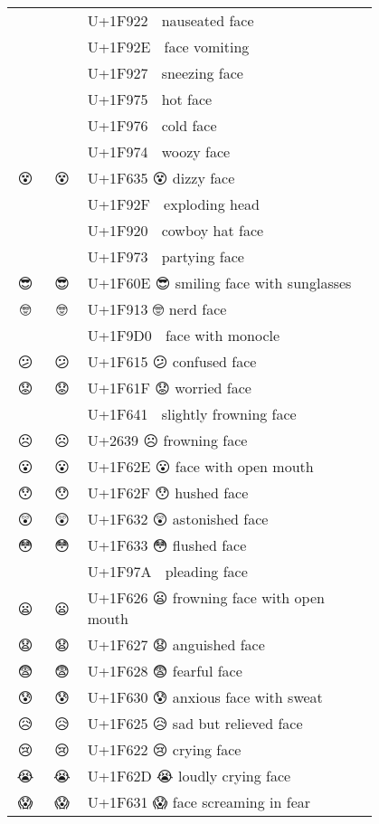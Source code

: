 \documentclass[a4paper,12pt]{ltjarticle}
\newcommand{\fontA}[1]{{\fontspec[RawFeature={mode=harf,+dist,+ccmp}]{Segoe UI Emoji} #1}}
\newcommand{\fontB}[1]{{\fontspec[RawFeature={mode=harf,+dist,+ccmp}]{Noto Color Emoji} #1}}
\begin{document}
\begin{longtable}[c]{ccp{0.8\linewidth}}
\fontA{🤢}&\fontB{🤢}&U+1F922 🤢 nauseated face\\
\fontA{🤮}&\fontB{🤮}&U+1F92E 🤮 face vomiting\\
\fontA{🤧}&\fontB{🤧}&U+1F927 🤧 sneezing face\\
\fontA{🥵}&\fontB{🥵}&U+1F975 🥵 hot face\\
\fontA{🥶}&\fontB{🥶}&U+1F976 🥶 cold face\\
\fontA{🥴}&\fontB{🥴}&U+1F974 🥴 woozy face\\
\fontA{😵}&\fontB{😵}&U+1F635 😵 dizzy face\\
\fontA{🤯}&\fontB{🤯}&U+1F92F 🤯 exploding head\\
\fontA{🤠}&\fontB{🤠}&U+1F920 🤠 cowboy hat face\\
\fontA{🥳}&\fontB{🥳}&U+1F973 🥳 partying face\\
\fontA{😎}&\fontB{😎}&U+1F60E 😎 smiling face with sunglasses\\
\fontA{🤓}&\fontB{🤓}&U+1F913 🤓 nerd face\\
\fontA{🧐}&\fontB{🧐}&U+1F9D0 🧐 face with monocle\\
\fontA{😕}&\fontB{😕}&U+1F615 😕 confused face\\
\fontA{😟}&\fontB{😟}&U+1F61F 😟 worried face\\
\fontA{🙁}&\fontB{🙁}&U+1F641 🙁 slightly frowning face\\
\fontA{☹}&\fontB{☹}&U+2639 ☹ frowning face\\
\fontA{😮}&\fontB{😮}&U+1F62E 😮 face with open mouth\\
\fontA{😯}&\fontB{😯}&U+1F62F 😯 hushed face\\
\fontA{😲}&\fontB{😲}&U+1F632 😲 astonished face\\
\fontA{😳}&\fontB{😳}&U+1F633 😳 flushed face\\
\fontA{🥺}&\fontB{🥺}&U+1F97A 🥺 pleading face\\
\fontA{😦}&\fontB{😦}&U+1F626 😦 frowning face with open mouth\\
\fontA{😧}&\fontB{😧}&U+1F627 😧 anguished face\\
\fontA{😨}&\fontB{😨}&U+1F628 😨 fearful face\\
\fontA{😰}&\fontB{😰}&U+1F630 😰 anxious face with sweat\\
\fontA{😥}&\fontB{😥}&U+1F625 😥 sad but relieved face\\
\fontA{😢}&\fontB{😢}&U+1F622 😢 crying face\\
\fontA{😭}&\fontB{😭}&U+1F62D 😭 loudly crying face\\
\fontA{😱}&\fontB{😱}&U+1F631 😱 face screaming in fear\\

\end{longtable}
\end{document}
